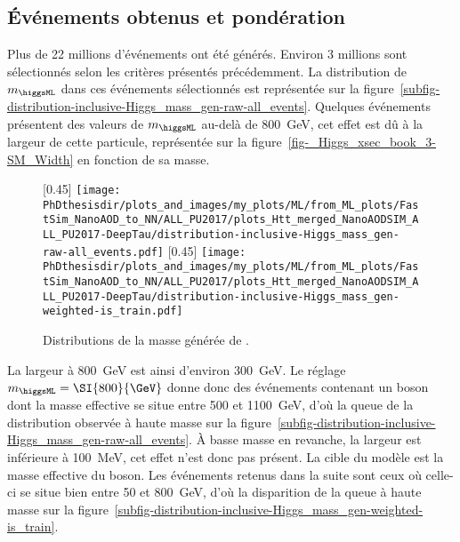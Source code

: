 \subsection{Événements obtenus et pondération}
Plus de 22 millions d'événements ont été générés.
Environ 3 millions sont sélectionnés selon les critères présentés précédemment.
La distribution de $m_{\higgsML}$ dans ces événements sélectionnés est représentée sur la figure~\ref{subfig-distribution-inclusive-Higgs_mass_gen-raw-all_events}.
Quelques événements présentent des valeurs de $m_{\higgsML}$ au-delà de \SI{800}{\GeV}, cet effet est dû à la largeur de cette particule,
représentée sur la figure~\ref{fig-_Higgs_xsec_book_3-SM_Width} en fonction de sa masse.
\begin{figure}[h]
\centering

[0.45\textwidth]
{\texttt{[image: \\PhDthesisdir/plots\_and\_images/my\_plots/ML/from\_ML\_plots/FastSim\_NanoAOD\_to\_NN/ALL\_PU2017/plots\_Htt\_merged\_NanoAODSIM\_ALL\_PU2017-DeepTau/distribution-inclusive-Higgs\_mass\_gen-raw-all\_events.pdf]}}
\hfill
{}[0.45\textwidth]
{\texttt{[image: \\PhDthesisdir/plots\_and\_images/my\_plots/ML/from\_ML\_plots/FastSim\_NanoAOD\_to\_NN/ALL\_PU2017/plots\_Htt\_merged\_NanoAODSIM\_ALL\_PU2017-DeepTau/distribution-inclusive-Higgs\_mass\_gen-weighted-is\_train.pdf]}}

\caption[Distributions de la masse générée de \higgsML.]{Distributions de la masse générée de \higgsML.}
\label{fig-distribution-inclusive-Higgs_mass_gen-raw-all_events}
\end{figure}
La largeur à \SI{800}{\GeV} est ainsi d'environ \SI{300}{\GeV}.
Le réglage $m_{\higgsML} = \SI{800}{\GeV}$ donne donc des événements contenant un boson dont la masse effective se situe entre \num{500} et \SI{1100}{\GeV}, d'où la queue de la distribution observée à haute masse sur la figure~\ref{subfig-distribution-inclusive-Higgs_mass_gen-raw-all_events}.
À basse masse en revanche, la largeur est inférieure à \SI{100}{\MeV}, cet effet n'est donc pas présent.
La cible du modèle est la masse effective du boson.
Les événements retenus dans la suite sont ceux où celle-ci se situe bien entre \num{50} et \SI{800}{\GeV},
d'où la disparition de la queue à haute masse sur la figure~\ref{subfig-distribution-inclusive-Higgs_mass_gen-weighted-is_train}.
